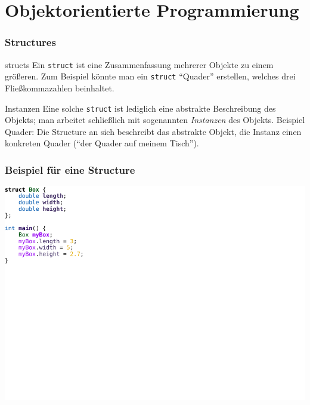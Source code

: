 \section{Objektorientierte Programmierung}
\begin{frame}
    \frametitle{Structures}
    \begin{block}{structs}
    Ein \texttt{struct} ist eine Zusammenfassung mehrerer Objekte zu einem größeren.
    Zum Beispiel könnte man ein \texttt{struct} "`Quader"' erstellen, welches drei Fließkommazahlen beinhaltet.
    \end{block}
    \begin{block}{Instanzen}
    Eine solche \texttt{struct} ist lediglich eine abstrakte Beschreibung des Objekts; man arbeitet schließlich mit sogenannten \emph{Instanzen} des Objekts. Beispiel Quader: Die Structure an sich beschreibt das abstrakte Objekt, die Instanz einen konkreten Quader ("`der Quader auf meinem Tisch"').
    \end{block}
\end{frame}
\begin{frame}
    \frametitle{Beispiel für eine Structure}
    \vspace{0.7cm}
    \includegraphics[width=15cm]{example_code/box.pdf}
\end{frame}

